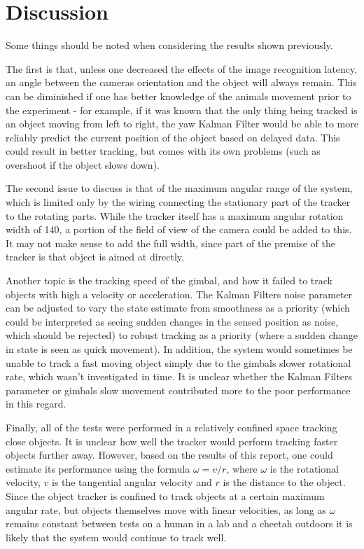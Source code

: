 \chapter{Discussion}\label{chap:discussion}

Some things should be noted when considering the results shown previously.

The first is that, unless one decreased the effects of the image recognition latency, an angle between the cameras orientation and the object will always remain. This can be diminished if one has better knowledge of the animals movement prior to the experiment - for example, if it was known that the only thing being tracked is an object moving from left to right, the yaw Kalman Filter would be able to more reliably predict the current position of the object based on delayed data. This could result in better tracking, but comes with its own problems (such as overshoot if the object slows down).

The second issue to discuss is that of the maximum angular range of the system, which is limited only by the wiring connecting the stationary part of the tracker to the rotating parts. While the tracker itself has a maximum angular rotation width of 140\textdegree, a portion of the field of view of the camera could be added to this. It may not make sense to add the full width, since part of the premise of the tracker is that object is aimed at directly.

Another topic is the tracking speed of the gimbal, and how it failed to track objects with high a velocity or acceleration. The Kalman Filters noise parameter can be adjusted to vary the state estimate from smoothness as a priority (which could be interpreted as seeing sudden changes in the sensed position as noise, which should be rejected) to robust tracking as a priority (where a sudden change in state is seen as quick movement). In addition, the system would sometimes be unable to track a fast moving object simply due to the gimbals slower rotational rate, which wasn't investigated in time. It is unclear whether the Kalman Filters parameter or gimbals slow movement contributed more to the poor performance in this regard.

Finally, all of the tests were performed in a relatively confined space tracking close objects. It is unclear how well the tracker would perform tracking faster objects further away. However, based on the results of this report, one could estimate its performance using the formula $\omega = v/r$, where $\omega$ is the rotational velocity, $v$ is the tangential angular velocity and $r$ is the distance to the object. Since the object tracker is confined to track objects at a certain maximum angular rate, but objects themselves move with linear velocities, as long as $\omega$ remains constant between tests on a human in a lab and a cheetah outdoors it is likely that the system would continue to track well.
